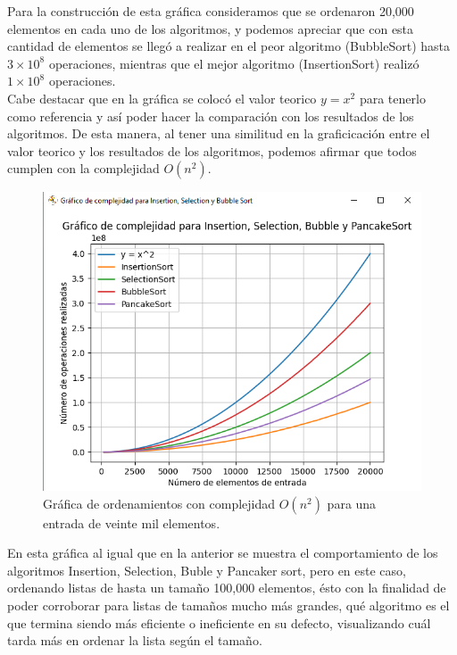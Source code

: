 \documentclass[a4paper,12pt]{article}
\begin{document}
Para la construcción de esta gráfica consideramos que se ordenaron 20,000 elementos en cada uno de los algoritmos, y podemos apreciar que con esta cantidad de elementos se llegó a realizar en el peor algoritmo (BubbleSort) hasta $3 \times 10^8$ operaciones, mientras que el mejor algoritmo (InsertionSort) realizó $1 \times 10^8$ operaciones. \\

Cabe destacar que en la gráfica se colocó el valor teorico $y = x^2$ para tenerlo como referencia y así poder hacer la comparación con los resultados de los algoritmos. De esta manera, al tener una similitud en la graficicación entre el valor teorico y los resultados de los algoritmos, podemos afirmar que todos cumplen con la complejidad $O(n^2)$.\\

\begin{figure}[h]
    \centering
    \includegraphics[width=1\textwidth]{media/graficaA_20k.png}
    \caption{Gráfica de ordenamientos con complejidad $O(n^2)$ para una entrada de veinte mil elementos.}
    \label{fig:grafA_20k}
\end{figure}

En esta gráfica al igual que en la anterior se muestra el comportamiento de los algoritmos Insertion, Selection, Buble y Pancaker sort, pero en este caso, ordenando listas de hasta un tamaño 100,000 elementos, ésto con la finalidad de poder corroborar para listas de tamaños mucho más grandes, qué algoritmo es el que termina siendo más eficiente o ineficiente en su defecto, visualizando cuál tarda más en ordenar la lista según el tamaño.\\
\end{document}
